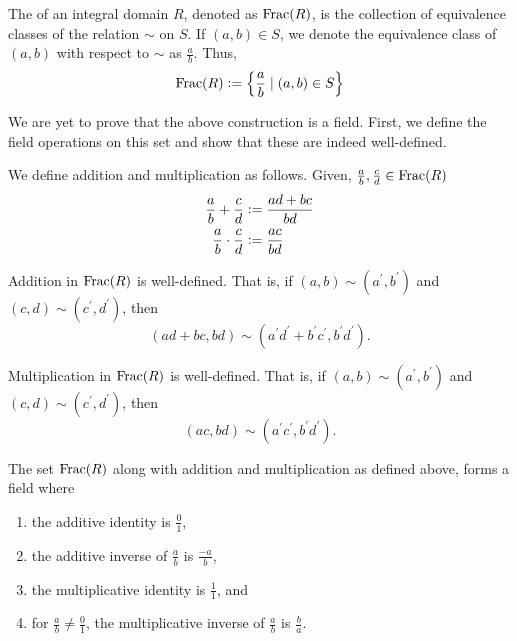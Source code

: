 \begin{defn}
    The  of an integral domain $R$, denoted as $\operatorname{Frac}(R)$, is the collection of equivalence classes of the relation $\sim$ on $S$. If $(a,b) \in S$, we denote the equivalence class of $(a,b)$ with respect to $\sim$ as $\frac{a}{b}$. Thus,
    \[
        \operatorname{Frac}(R) \vcentcolon= \left\{ \frac{a}{b} \mid (a,b) \in S \right\}
    \]
\end{defn}

We are yet to prove that the above construction is a field. First, we define the field operations on this set and show that these are indeed well-defined.

\begin{defn}
    We define addition and multiplication as follows. Given, $\frac{a}{b}, \frac{c}{d} \in \operatorname{Frac}(R)$
\begin{align*}
    \frac{a}{b} + \frac{c}{d} &\vcentcolon= \frac{ad + bc}{bd} \\
    \frac{a}{b} \cdot \frac{c}{d} &\vcentcolon= \frac{ac}{bd}
\end{align*}
\end{defn}

\begin{prop}
    Addition in $\operatorname{Frac}(R)$ is well-defined. That is, if $(a,b) \sim (a^{\prime}, b^{\prime})$ and $(c,d) \sim (c^{\prime}, d^{\prime})$, then
    \[
        (ad + bc, bd) \sim (a^{\prime}d^{\prime} + b^{\prime}c^{\prime}, b^{\prime}d^{\prime}).
    \]
\end{prop}

\begin{prop}
    Multiplication in $\operatorname{Frac}(R)$ is well-defined. That is, if $(a,b) \sim (a^{\prime}, b^{\prime})$ and $(c,d) \sim (c^{\prime}, d^{\prime})$, then
    \[
        (ac, bd) \sim (a^{\prime}c^{\prime}, b^{\prime}d^{\prime}).
    \]
\end{prop}

\begin{theorem}
    The set $\operatorname{Frac}(R)$ along with addition and multiplication as defined above, forms a field where 
    \begin{enumerate}
        \item the additive identity is $\frac{0}{1}$,
        \item the additive inverse of $\frac{a}{b}$ is $\frac{-a}{b}$,
        \item the multiplicative identity is $\frac{1}{1}$, and
        \item for $\frac{a}{b} \neq \frac{0}{1}$, the multiplicative inverse of $\frac{a}{b}$ is $\frac{b}{a}$.
    \end{enumerate}
\end{theorem}

